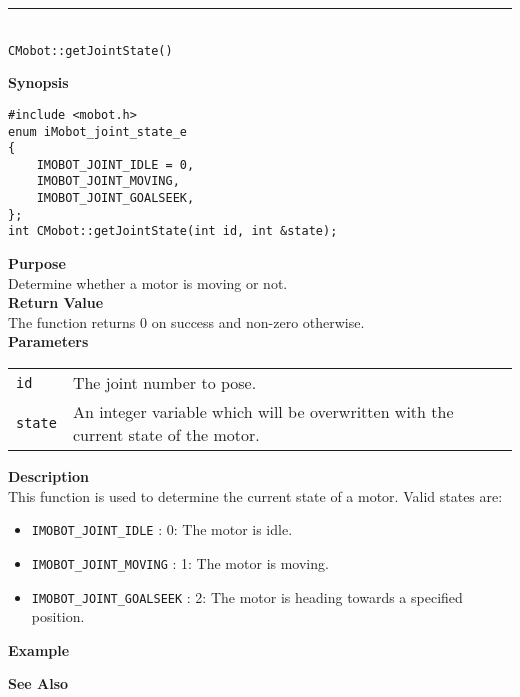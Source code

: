 \noindent
\vspace{5pt}
\rule{4.5in}{0.015in}\\
\noindent
{\LARGE \texttt{CMobot::getJointState()}}\\
{}

\noindent
{\bf Synopsis}\\
\begin{verbatim}
#include <mobot.h>
enum iMobot_joint_state_e
{
    IMOBOT_JOINT_IDLE = 0,
    IMOBOT_JOINT_MOVING,
    IMOBOT_JOINT_GOALSEEK,
};
int CMobot::getJointState(int id, int &state);
\end{verbatim}

\noindent
{\bf Purpose}\\
Determine whether a motor is moving or not.\\

\noindent
{\bf Return Value}\\
The function returns 0 on success and non-zero otherwise.\\

\noindent
{\bf Parameters}
\vspace{-0.1in}
\begin{description}
\item               
\begin{tabular}{p{10 mm}p{145 mm}}
\texttt{id} & The joint number to pose. \\
\texttt{state} & An integer variable which will be overwritten with the current state of the motor. 
\end{tabular}
\end{description}

\noindent
{\bf Description}\\
This function is used to determine the current state of a motor. Valid states are:
\begin{itemize}
\item \texttt{IMOBOT\_JOINT\_IDLE} : 0: The motor is idle.
\item \texttt{IMOBOT\_JOINT\_MOVING} : 1: The motor is moving.
\item \texttt{IMOBOT\_JOINT\_GOALSEEK} : 2: The motor is heading towards a specified position.
\end{itemize}

\noindent
{\bf Example}\\
\noindent

\noindent
{\bf See Also}\\

